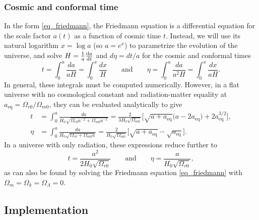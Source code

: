 \documentclass[10pt,a4paper]{article}
\begin{document}
\subsubsection{Cosmic and conformal time}

In the form \eqref{eq_friedmann},
the Friedmann equation is a differential equation for the scale factor $a(t)$
as a function of cosmic time $t$.
Instead, we will use its natural logarithm $x = \log a$ (so $a = e^x$) to parametrize the evolution of the universe,
and solve $H = \frac1a \odv{a}{t}$ and $d\eta = dt / a$ for the cosmic and conformal times
\begin{equation}
	t = \int_0^a \frac{da}{aH} = \int_0^x \frac{dx}{H}
	\qquad \text{and} \qquad
	\eta = \int_0^a \frac{da}{a^2 H} = \int_0^x \frac{dx}{aH}.
\label{eq_cosmic_conformal_time}
\end{equation}
In general, these integrals must be computed numerically.
However, in a flat universe with no cosmological constant and radiation-matter equality at $a_\text{eq} = \Omega_{r0}/\Omega_{m0}$,
they can be evaluated analytically to give
\begin{subequations}
\begin{align}
	t &= \int_0^a \frac{da}{H_0 \sqrt{\Omega_{r0}a^{-2} + \Omega_{m0}a^{-1}}}
	   = \frac{2}{3 H_0 \sqrt{\Omega_{m0}}} \Big[\sqrt{a + a_\text{eq}} \big(a - 2 a_\text{eq}\big) + 2 a_\text{eq}^{3/2} \Big]
	\label{eq_cosmic_time_anal}, \\
	\eta &= \int_0^a \frac{da}{H_0 \sqrt{\Omega_{r0} + \Omega_{m0} a}}
		 = \frac{2}{H_0 \sqrt{\Omega_{m0}}} \Big[ \sqrt{a + a_\text{eq}} - \sqrt{a_\text{eq}}\Big]
	\label{eq_conformal_time_anal}.
\end{align}
\label{eq_cosmic_conformal_time_anal}
\end{subequations}
In a universe with only radiation, these expressions reduce further to
\begin{equation}
	t = \frac{a^2}{2 H_0 \sqrt{\Omega_{r0}}}
	\qquad \text{and} \qquad
	\eta = \frac{a}{H_0 \sqrt{\Omega_{r0}}},
\label{eq_cosmic_conformal_time_anal_radiation}
\end{equation}
as can also be found by solving the Friedmann equation \eqref{eq_friedmann} with $\Omega_{m} = \Omega_{k} = \Omega_{\Lambda} = 0$.


\subsection{Implementation}
\label{sec_background_cosmology_implementation}
\end{document}
